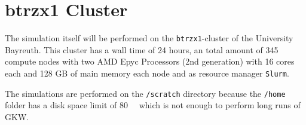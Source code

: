 \section{btrzx1 Cluster}
\label{sec:cluster}

The simulation itself will be performed on the \texttt{btrzx1}-cluster of the University Bayreuth. This cluster has a wall time of 24 hours, an total amount of 345 compute nodes with
two AMD Epyc Processors (2nd generation) with 16 cores each and 128 GB of main memory each node and as resource manager \texttt{Slurm}. \cite{btrzx1}

The simulations are performed on the \texttt{/scratch} directory because the \texttt{/home} folder has a disk space limit of \SI{80}{\giga\byte} which is not enough to perform long runs of GKW.
